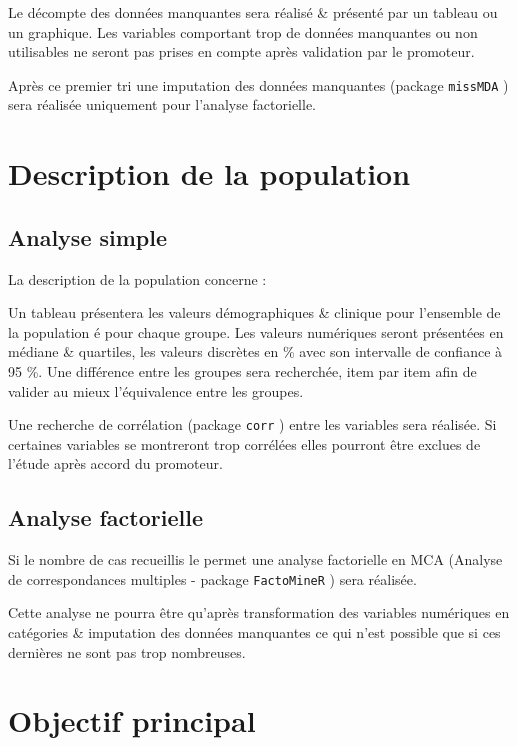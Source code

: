 \documentclass[
  a4paperpaper,
  french,
  oneside,
  open=any]{scrreprt}
\begin{document}
Le décompte des données manquantes sera réalisé \& présenté par un
tableau ou un graphique. Les variables comportant trop de données
manquantes ou non utilisables ne seront pas prises en compte après
validation par le promoteur.

Après ce premier tri une imputation des données manquantes (package
\texttt{missMDA} \autocite{miss}) sera réalisée uniquement pour
l'analyse factorielle.

\hypertarget{description-de-la-population}{%
\chapter{Description de la
population}\label{description-de-la-population}}

\hypertarget{analyse-simple}{%
\section{Analyse simple}\label{analyse-simple}}

La description de la population concerne :

Un tableau présentera les valeurs démographiques \& clinique pour
l'ensemble de la population é pour chaque groupe. Les valeurs numériques
seront présentées en médiane \& quartiles, les valeurs discrètes en \%
avec son intervalle de confiance à 95 \%. Une différence entre les
groupes sera recherchée, item par item afin de valider au mieux
l'équivalence entre les groupes.

Une recherche de corrélation (package \texttt{corr} \autocite{corr})
entre les variables sera réalisée. Si certaines variables se montreront
trop corrélées elles pourront être exclues de l'étude après accord du
promoteur.

\hypertarget{analyse-factorielle}{%
\section{Analyse factorielle}\label{analyse-factorielle}}

Si le nombre de cas recueillis le permet une analyse factorielle en MCA
(Analyse de correspondances multiples - package \texttt{FactoMineR}
\autocite{facto}) sera réalisée.

Cette analyse ne pourra être qu'après transformation des variables
numériques en catégories \& imputation des données manquantes ce qui
n'est possible que si ces dernières ne sont pas trop nombreuses.

\hypertarget{objectif-principal}{%
\chapter{Objectif principal}\label{objectif-principal}}
\end{document}
